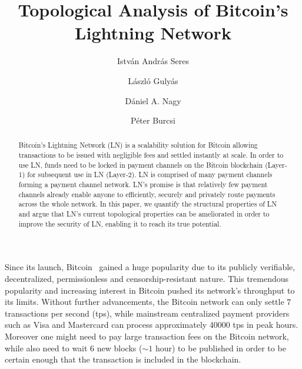 \documentclass[runningheads]{llncs}
\begin{document}
%
\title{Topological Analysis of Bitcoin's Lightning Network}
%
%
\author{István András Seres \and
László Gulyás \and
Dániel A. Nagy \and
Péter Burcsi}
%
%
%
\maketitle              %
%
\begin{abstract}
Bitcoin's Lightning Network (LN) is a scalability solution for Bitcoin allowing transactions to be issued with negligible fees and settled instantly at scale. In order to use LN, funds need to be locked in payment channels on the Bitcoin blockchain (Layer-1) for subsequent use in LN (Layer-2). LN is comprised of many payment channels forming a payment channel network. LN's promise is that relatively few payment channels already enable anyone to efficiently, securely and privately route payments across the whole network. In this paper, we quantify the structural properties of LN and argue that LN's current topological properties can be ameliorated in order to improve the security of LN, enabling it to reach its true potential.

\end{abstract}
%
%
%
Since its launch, Bitcoin~\cite{nakamoto2008bitcoin} gained a huge popularity due to its publicly verifiable, decentralized, permissionless and censorship-resistant nature. This tremendous popularity and increasing interest in Bitcoin pushed its network's throughput to its limits. Without further advancements, the Bitcoin network can only settle $7$ transactions per second (tps), while mainstream centralized payment providers such as Visa and Mastercard can process approximately \num[group-separator={,}]{40000} tps in peak hours. Moreover one might need to pay large transaction fees on the Bitcoin network, while also need to wait 6 new blocks ($\sim 1$ hour) to be published in order to be certain enough that the transaction is included in the blockchain.
\end{document}

